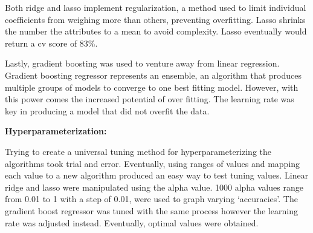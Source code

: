 \documentclass[letterpaper,10pt]{article}
\begin{document}
Both ridge and lasso implement regularization, a method used to limit individual coefficients from weighing more than others, preventing overfitting. Lasso shrinks the number the attributes to a mean to avoid complexity. Lasso eventually would return a cv score of 83\%. \par
Lastly, gradient boosting was used to venture away from linear regression. Gradient boosting regressor represents an ensemble, an algorithm that produces multiple groups of models to converge to one best fitting model. However, with this power comes the increased potential of over fitting. The learning rate was key in producing a model that did not overfit the data.\par
    \textbf{Hyperparameterization:} \par
Trying to create a universal tuning method for hyperparameterizing the algorithms took trial and error. Eventually, using ranges of values and mapping each value to a new algorithm produced an easy way to test tuning values. Linear ridge and lasso were manipulated using the alpha value. 1000 alpha values range from 0.01 to 1 with a step of 0.01, were used to graph varying ‘accuracies’. The gradient boost regressor was tuned with the same process however the learning rate was adjusted instead. Eventually,  optimal values were obtained.  
\end{document}
